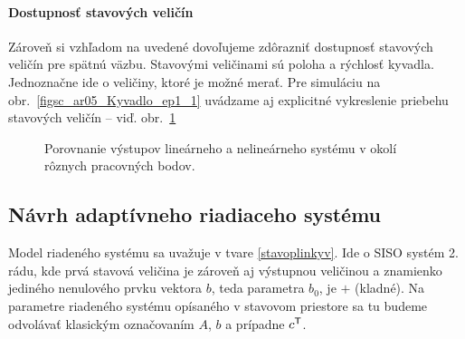 \documentclass[a4paper, 10pt, ]{article}
\begin{document}






\paragraph{Dostupnosť stavových veličín}

Zároveň si vzhľadom na uvedené dovoľujeme zdôrazniť dostupnosť stavových veličín pre spätnú väzbu. Stavovými veličinami sú poloha a rýchlosť kyvadla. Jednoznačne ide o veličiny, ktoré je možné merať. Pre simuláciu na obr.~\ref{figsc_ar05_Kyvadlo_ep1_1} uvádzame aj explicitné vykreslenie priebehu stavových veličín -- viď. obr.~\ref{figsc_ar05_Kyvadlo_ep1_ss_1}






\begin{figure}[!b]
	\centering

    \vspace{-3mm}


    \vspace{-2mm}

	\caption{Porovnanie výstupov lineárneho a nelineárneho systému v okolí rôznych pracovných bodov.}
	\label{figsc_ar05_Kyvadlo_ep1_ss_1}

    \vspace{-2mm}

\end{figure}







\subsection{Návrh adaptívneho riadiaceho systému}

Model riadeného systému sa uvažuje v tvare \eqref{stavoplinkyv}. Ide o SISO systém 2. rádu, kde prvá stavová veličina je zároveň aj výstupnou veličinou a znamienko jediného nenulového prvku vektora $b$, teda parametra $b_0$, je $+$ (kladné). Na parametre riadeného systému opísaného v stavovom priestore sa tu budeme odvolávať klasickým označovaním $A$, $b$ a prípadne $c^{\mathsf{T}}$.
\end{document}
